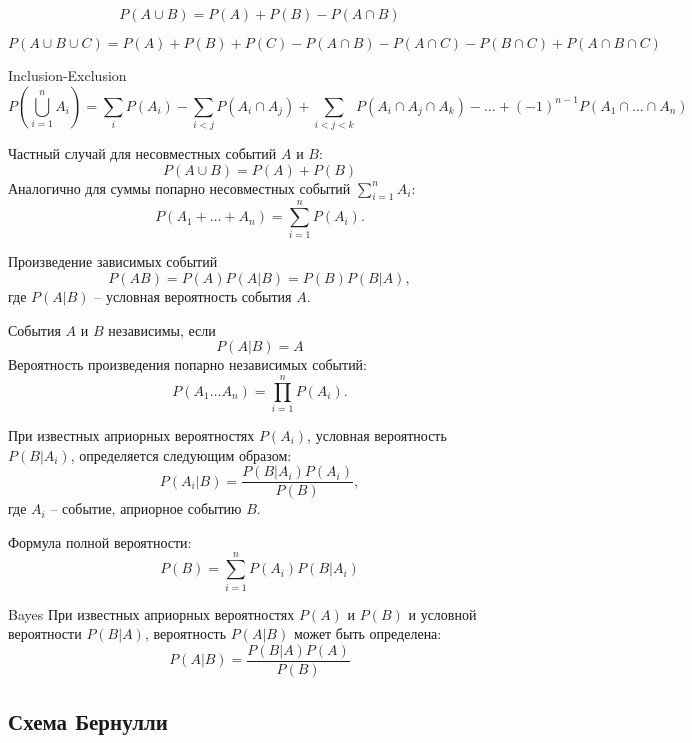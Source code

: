 \begin{theorema}{}{}
    \[
        P(A \cup B) = P(A) + P(B) - P(A \cap B)  
    \]
\end{theorema}
\cons 
\[
    P(A \cup B \cup C) = P(A) + P(B) + P(C) - P(A\cap B) - P(A\cap C) - P(B \cap C) + P(A\cap B \cap C)  
\]
\begin{theorema}{Inclusion-Exclusion}{}
    \[
        P\left(\bigcup\limits_{i=1}^n A_i\right) = \sum\limits_i P(A_i) - \sum\limits_{i < j} P(A_i \cap A_j) + \sum\limits_{i < j < k} P(A_i \cap A_j \cap A_k) - \ldots + \left(-1\right)^{n-1}P\left(A_1 \cap \ldots \cap A_n\right)
    \]
\end{theorema}
\begin{note}{}{}
    Частный случай для несовместных событий $A$ и $B$:
    \[
        P(A\cup B) = P(A) + P(B)  
    \]
    Аналогично для суммы попарно несовместных событий $\sum\limits_{i=1}^n A_i$:
    \[
        P(A_1 + \ldots + A_n) = \sum\limits_{i=1}^n P(A_i). 
    \]
\end{note}
\begin{theorema}{}{}
    Произведение зависимых событий
  \[
        P(AB) = P(A)P(A|B) = P(B)P(B|A),
  \]
  где $P(A|B)$ -- условная вероятность события $A$.
\end{theorema}
\begin{note}{}{}
    События $A$ и $B$ независимы, если 
    \[
        P(A|B) = A
    \] 
    Вероятность произведения попарно независимых событий:
    \[
        P(A_1 \ldots A_n) = \prod\limits_{i=1}^n P(A_i).  
    \] 
\end{note}

\begin{definition}{}{}
    При известных априорных вероятностях $P(A_i)$, условная вероятность $P(B|A_i)$, определяется следующим образом:
    \[
        P(A_i| B) = \dfrac{P(B|A_i)P(A_i)}{P(B)},  
    \]  
    где $A_i$ -- событие, априорное событию $B$.
\end{definition}
\begin{theorema}{}{}
  Формула полной вероятности:
  \[
    P(B) = \sum\limits_{i=1}^n P(A_i)P(B|A_i)
  \]  
\end{theorema}
\begin{theorema}{Bayes}{}
    При известных априорных вероятностях $P(A)$ и $P(B)$ и условной вероятности $P(B|A)$, вероятность $P(A|B)$ может быть определена:
    \[
        P(A|B) = \dfrac{P(B|A)P(A)}{P(B)}  
    \]
\end{theorema}

\subsection*{Схема Бернулли}

